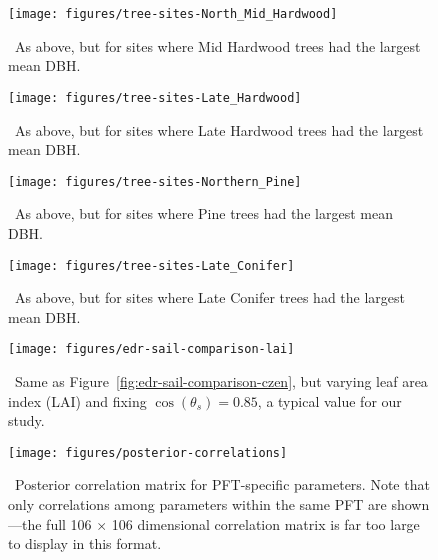 \clearpage

\begin{figure}[ht]
  \centering
  \texttt{[image: figures/tree-sites-North\_Mid\_Hardwood]}
  \caption{\label{fig:tree-sites-MH}\
    As above, but for sites where Mid Hardwood trees had the largest mean DBH.\@
  }
\end{figure}

\clearpage

\begin{figure}[ht]
  \centering
  \texttt{[image: figures/tree-sites-Late\_Hardwood]}
  \caption{\label{fig:tree-sites-LH}\
    As above, but for sites where Late Hardwood trees had the largest mean DBH.\@
  }
\end{figure}

\clearpage

\begin{figure}[ht]
  \centering
  \texttt{[image: figures/tree-sites-Northern\_Pine]}
  \caption{\label{fig:tree-sites-P}\
    As above, but for sites where Pine trees had the largest mean DBH.\@
  }
\end{figure}

\clearpage

\begin{figure}[ht]
  \centering
  \texttt{[image: figures/tree-sites-Late\_Conifer]}
  \caption{\label{fig:tree-sites-LC}\
    As above, but for sites where Late Conifer trees had the largest mean DBH.\@
  }
\end{figure}

\clearpage

\begin{figure}[ht]
  \centering
  \texttt{[image: figures/edr-sail-comparison-lai]}
  \caption{\label{fig:edr-sail-comparison-lai}\
    Same as Figure~\ref{fig:edr-sail-comparison-czen}, but varying leaf area index (LAI) and fixing $\cos(\theta_{s}) = 0.85$, a typical value for our study.
  }
\end{figure}

\clearpage

\begin{figure}[ht]
  \centering
  \texttt{[image: figures/posterior-correlations]}
  \caption{\label{fig:posterior-correlations}\
    Posterior correlation matrix for PFT-specific parameters.
    Note that only correlations among parameters within the same PFT are shown---the full 106 $\times$ 106 dimensional correlation matrix is far too large to display in this format.
  }
\end{figure}
